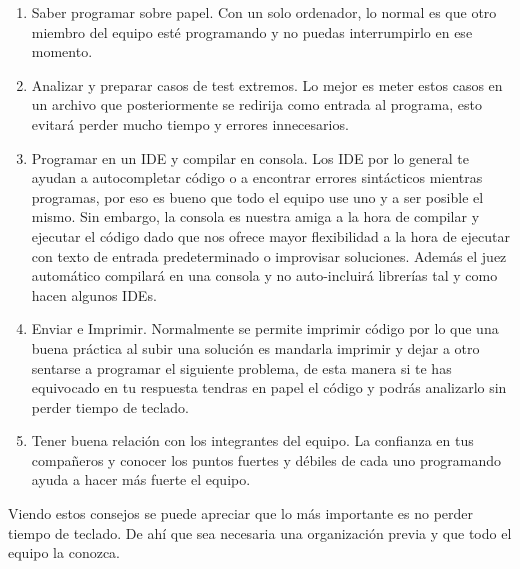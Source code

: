 \begin{enumerate}
\item Saber programar sobre papel. Con un solo ordenador, lo normal es
  que otro miembro del equipo esté programando y no puedas
  interrumpirlo en ese momento.

\item Analizar y preparar casos de test extremos. Lo mejor es meter
  estos casos en un archivo que posteriormente se redirija como
  entrada al programa, esto evitará perder mucho tiempo y errores
  innecesarios.

\item Programar en un IDE y compilar en consola. Los IDE por lo
  general te ayudan a autocompletar código o a encontrar errores
  sintácticos mientras programas, por eso es bueno que todo el equipo
  use uno y a ser posible el mismo. Sin embargo, la consola es nuestra
  amiga a la hora de compilar y ejecutar el código dado que nos ofrece
  mayor flexibilidad a la hora de ejecutar con texto de entrada
  predeterminado o improvisar soluciones. Además el juez automático
  compilará en una consola y no auto-incluirá librerías tal y como
  hacen algunos IDEs.

\item Enviar e Imprimir. Normalmente se permite imprimir código por lo
  que una buena práctica al subir una solución es mandarla imprimir y
  dejar a otro sentarse a programar el siguiente problema, de esta
  manera si te has equivocado en tu respuesta tendras en papel el
  código y podrás analizarlo sin perder tiempo de teclado.

\item Tener buena relación con los integrantes del equipo. La
  confianza en tus compañeros y conocer los puntos fuertes y débiles
  de cada uno programando ayuda a hacer más fuerte el equipo.
\end{enumerate}
Viendo estos consejos se puede apreciar que lo más importante es no
perder tiempo de teclado. De ahí que sea necesaria una organización
previa y que todo el equipo la conozca.\\

